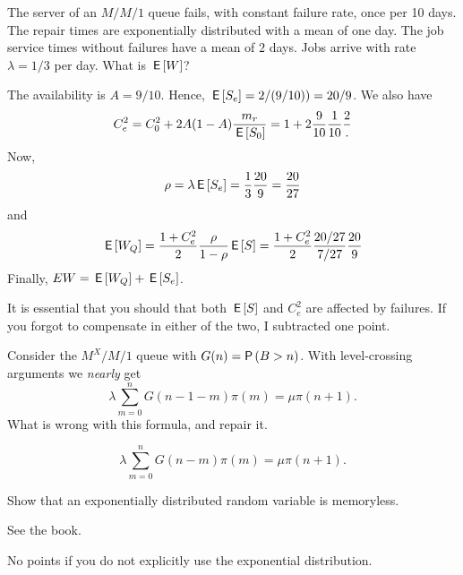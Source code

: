 \begin{exercise}[201704]
 The server of an $M/M/1$ queue fails, with constant failure rate, once per 10 days.
 The repair times are exponentially distributed with a mean of one day.
 The job service times without failures have a mean of $2$ days.
 Jobs arrive with rate $\lambda=1/3$ per day.
 What is $\,\mathsf{E}\left[W\right]$?
\begin{solution}
 The availability is $A=9/10$. Hence, $\,\mathsf{E}\left[S_e\right] = 2/(9/10)) = 20/9$. We also have
\begin{equation*}
 C_e^2 = C_0^2 + 2A(1-A)\frac{m_r}{\,\mathsf{E}\left[S_0\right]} = 1 + 2\frac{9}{10}\frac1{10}\frac{2}.
 \end{equation*}
Now,
\begin{equation*}
 \rho = \lambda \,\mathsf{E}\left[S_e\right] = \frac13 \frac{20}9 = \frac{20}{27}
\end{equation*}
and
\begin{equation*}
 \,\mathsf{E}\left[W_Q\right] = \frac{1 + C_e^2}2 \frac{\rho}{1-\rho} \,\mathsf{E}\left[S\right] = \frac{1 + C_e^2}2 \frac{20/27}{7/27} \frac{20}9
\end{equation*}
Finally, $E W = \,\mathsf{E}\left[W_Q\right] + \,\mathsf{E}\left[S_e\right]$.

It is essential that you should that both $\,\mathsf{E}\left[S\right]$ and $C_e^2$ are affected by failures. If you forgot to compensate in either of the two, I subtracted one point. 
\end{solution}
\end{exercise}

\begin{exercise}[201704]%
 Consider the $M^X/M/1$ queue with $G(n) = \P{B>n}$.
 With level-crossing arguments we \emph{nearly} get
\begin{equation*}
\lambda \sum_{m=0}^n G(n-1-m) \pi(m) = \mu \pi(n+1).
\end{equation*}
What is wrong with this formula, and repair it.
\begin{solution}
\begin{equation*}
\lambda \sum_{m=0}^n G(n-m) \pi(m) = \mu \pi(n+1).
\end{equation*}
\end{solution}
\end{exercise}


\begin{exercise}[201706]
 Show that an exponentially distributed random variable is memoryless.
\begin{solution}
 See the book.

No points if you do not explicitly use the exponential distribution.
\end{solution}
\end{exercise}


